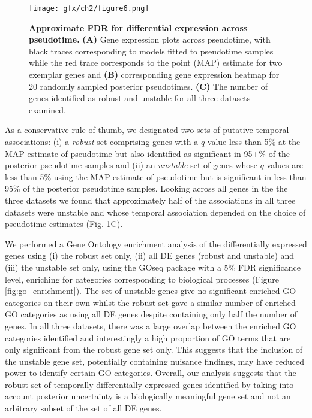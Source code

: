 \begin{figure}[h]
	\centering
	\texttt{[image: gfx/ch2/figure6.png]}
\caption{ {\bf Approximate FDR for differential expression across pseudotime.}
\textbf{(A)} Gene expression plots across pseudotime, with black traces corresponding to models fitted to pseudotime samples while the red trace corresponds to the point (MAP) estimate for two exemplar genes and \textbf{(B)} corresponding gene expression heatmap for 20 randomly sampled posterior pseudotimes.
\textbf{(C)} The number of genes identified as robust and unstable for all three datasets examined.}
\label{fig:afdr}
\end{figure}

As a conservative rule of thumb, we designated two sets of putative temporal associations: (i) a \emph{robust} set comprising genes with a $q$-value less than 5\% at the MAP estimate of pseudotime but also identified as significant in 95+\% of the posterior pseudotime samples and (ii) an \emph{unstable} set of genes whose $q$-values are less than 5\% using the MAP estimate of pseudotime but is significant in less than 95\% of the posterior pseudotime samples. Looking across all genes in the the three datasets we found that approximately half of the associations in all three datasets were unstable and whose temporal association depended on the choice of pseudotime estimates (Fig. \ref{fig:afdr}C).

We performed a Gene Ontology enrichment analysis of the differentially expressed genes using (i) the robust set only, (ii) all DE genes (robust and unstable) and (iii) the unstable set only, using the GOseq package \cite{young2010gene} with a 5\% FDR significance level, enriching for categories corresponding to biological processes (Figure \ref{fig:go_enrichment}). The set of unstable genes give no significant enriched GO categories on their own whilst the robust set gave a similar number of enriched GO categories as using all DE genes despite containing only half the number of genes. In all three datasets, there was a large overlap between the enriched GO categories identified and interestingly a high proportion of GO terms that are only significant from the robust gene set only. This suggests that the inclusion of the unstable gene set, potentially containing nuisance findings, may have reduced power to identify certain GO categories. Overall, our analysis suggests that the robust set of temporally differentially expressed genes identified by taking into account posterior uncertainty is a biologically meaningful gene set and not an arbitrary subset of the set of all DE genes.


